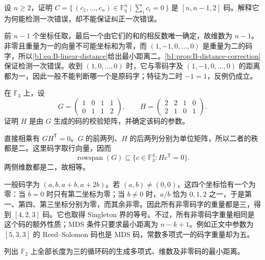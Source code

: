 \begin{exercise}\label{b1:ex:B-parity-code}
	设 \(n\geq2\)，证明 \(C=\{\,(c_1,\ldots,c_n)\in\mathbb F_q^n\mid\sum_i c_i=0\,\}\) 是 \([n,n-1,2]\) 码。解释它为何能检测一次错误，却不能保证纠正一次错误。
\end{exercise}

\begin{solution}
	前 \(n-1\) 个坐标任取，最后一个由它们的和的相反数唯一确定，故维数为 \(n-1\)。非零且重量为一的向量不可能坐标和为零，而 \((1,-1,0,\ldots,0)\) 是重量为二的码字，所以\eqref{b1:eq:B-linear-distance}给出最小距离二。\cref{b1:prop:B-distance-correction}保证检测一次错误。收到 \((1,0,\ldots,0)\) 时，它与零码字及 \((1,-1,0,\ldots,0)\) 的距离都为一，因此一般不能判断哪一个是原码字；特征为二时 \(-1=1\)，反例仍成立。
\end{solution}

\begin{exercise}\label{b1:ex:B-generator-check}
	在 \(\mathbb F_3\) 上，设
	\[
		G=\begin{pmatrix}1&0&1&1\\0&1&1&2\end{pmatrix},\qquad
		H=\begin{pmatrix}2&2&1&0\\2&1&0&1\end{pmatrix}.
	\]
	证明 \(H\) 是由 \(G\) 生成的码的校验矩阵，并确定该码的参数。
\end{exercise}

\begin{solution}
	直接相乘有 \(GH^{\mathsf T}=0\)。\(G\) 的前两列、\(H\) 的后两列分别为单位矩阵，所以二者的秩都是二。这里码字取行向量，因而
	\[
		\operatorname{rowspan}(G)\subseteq\{c\in\mathbb F_3^4:Hc^{\mathsf T}=0\}.
	\]
	两侧维数都是二，故相等。

	一般码字为 \((a,b,a+b,a+2b)\)。若 \((a,b)\ne(0,0)\)，这四个坐标恰有一个为零：当 \(b=0\) 时只有第二坐标为零；当 \(b\ne0\) 时，\(a/b\) 恰为 \(0,1,2\) 之一，于是第一、第四、第三坐标分别为零，而其余非零。因此所有非零码字的重量都是三，得到 \([4,2,3]\) 码。它也取得 Singleton 界的等号。不过，所有非零码字重量相同是这个码的额外性质；MDS 条件只要求最小距离为 \(n-k+1\)。例如正文中参数为 \([5,3,3]\) 的 Reed--Solomon 码也是 MDS 码，常数多项式一的码字重量却为五。
\end{solution}

\begin{exercise}\label{b1:ex:B-cyclic-three}
	列出 \(\mathbb F_2\) 上全部长度为三的循环码的生成多项式、维数及非零码的最小距离。
\end{exercise}

